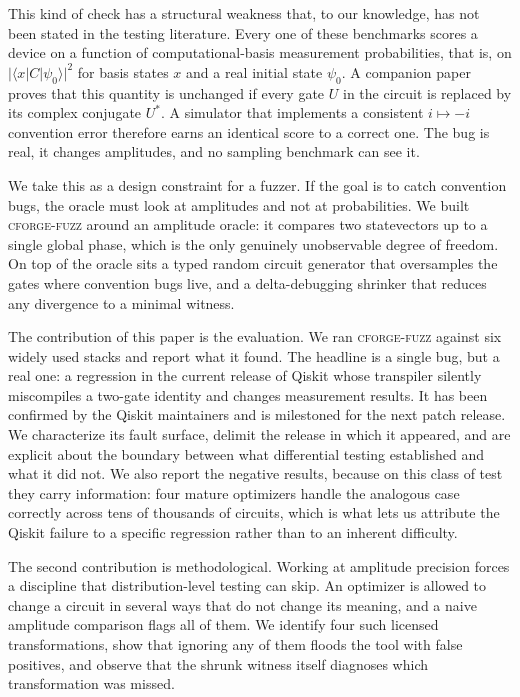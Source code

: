 \documentclass[11pt]{article}
\newcommand{\ket}[1]{\lvert #1 \rangle}
\newcommand{\bra}[1]{\langle #1 \rvert}
\newcommand{\tool}{\textsc{cforge-fuzz}}
\begin{document}
This kind of check has a structural weakness that, to our knowledge, has
not been stated in the testing literature. Every one of these benchmarks
scores a device on a function of computational-basis measurement
probabilities, that is, on $\lvert\bra{x}C\ket{\psi_0}\rvert^2$ for basis
states $x$ and a real initial state $\psi_0$. A companion paper proves
that this quantity is unchanged if every gate $U$ in the circuit is
replaced by its complex conjugate $U^*$. A simulator that implements a
consistent $i \mapsto -i$ convention error therefore earns an identical
score to a correct one. The bug is real, it changes amplitudes, and no
sampling benchmark can see it.

We take this as a design constraint for a fuzzer. If the goal is to
catch convention bugs, the oracle must look at amplitudes and not at
probabilities. We built \tool{} around an amplitude oracle: it compares
two statevectors up to a single global phase, which is the only genuinely
unobservable degree of freedom. On top of the oracle sits a typed random
circuit generator that oversamples the gates where convention bugs live,
and a delta-debugging shrinker that reduces any divergence to a minimal
witness.

The contribution of this paper is the evaluation. We ran \tool{} against
six widely used stacks and report what it found. The headline is a single
bug, but a real one: a regression in the current release of Qiskit whose
transpiler silently miscompiles a two-gate identity and changes
measurement results. It has been confirmed by the Qiskit maintainers and
is milestoned for the next patch release. We characterize its fault
surface, delimit the release in which it appeared, and are explicit about
the boundary between what differential testing established and what it
did not. We also report the negative results,
because on this class of test they carry information: four mature
optimizers handle the analogous case correctly across tens of thousands
of circuits, which is what lets us attribute the Qiskit failure to a
specific regression rather than to an inherent difficulty.

The second contribution is methodological. Working at amplitude precision
forces a discipline that distribution-level testing can skip. An
optimizer is allowed to change a circuit in several ways that do not
change its meaning, and a naive amplitude comparison flags all of them.
We identify four such licensed transformations, show that ignoring any of
them floods the tool with false positives, and observe that the shrunk
witness itself diagnoses which transformation was missed.
\end{document}
